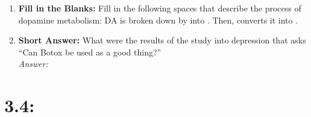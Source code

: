 \begin{enumerate}[label=\textbf{Q3.3.\arabic*}]
    \item \textbf{Fill in the Blanks:} Fill in the following spaces that describe the process of dopamine metabolism:
    DA is broken down by \underline{\hspace{3cm}} into \underline{\hspace{3cm}}. Then, \underline{\hspace{3cm}} converts it into \underline{\hspace{3cm}}. \\

    \item \textbf{Short Answer:} What were the results of the study into depression that asks ``Can Botox be used as a good thing?'' \\
        \textit{Answer:} \\%
\end{enumerate}

\squigglyline
\section*{3.4: %
}

